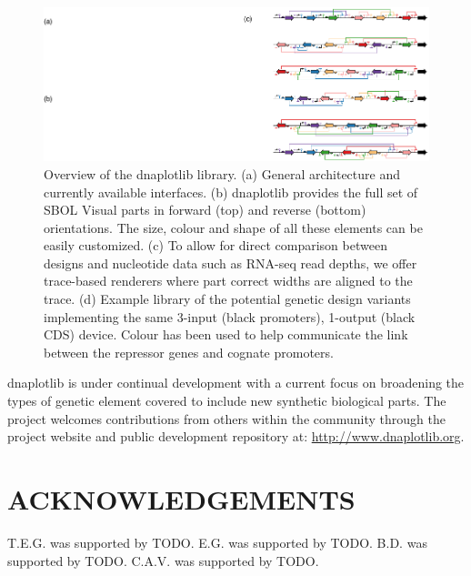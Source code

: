 \documentclass{bioinfo}
\begin{document}
\begin{figure}[t]
\centering
\includegraphics[width=\textwidth]{Figure1.pdf}
\caption{\label{fig:overview}Overview of the dnaplotlib library. (a) General architecture and currently available interfaces. (b) dnaplotlib provides the full set of SBOL Visual parts in forward (top) and reverse (bottom) orientations. The size, colour and shape of all these elements can be easily customized. (c) To allow for direct comparison between designs and nucleotide data such as RNA-seq read depths, we offer trace-based renderers where part correct widths are aligned to the trace. (d) Example library of the potential genetic design variants implementing the same 3-input (black promoters), 1-output (black CDS) device. Colour has been used to help communicate the link between the repressor genes and cognate promoters.}
\end{figure}


dnaplotlib is under continual development with a current focus on broadening the types of genetic element covered to include new synthetic biological parts. The project welcomes contributions from others within the community through the project website and public development repository at: \href{http://www.dnaplotlib.org}{http://www.dnaplotlib.org}.

\section*{ACKNOWLEDGEMENTS}
T.E.G. was supported by TODO. E.G. was supported by TODO. B.D. was supported by TODO. C.A.V. was supported by TODO.
\end{document}
